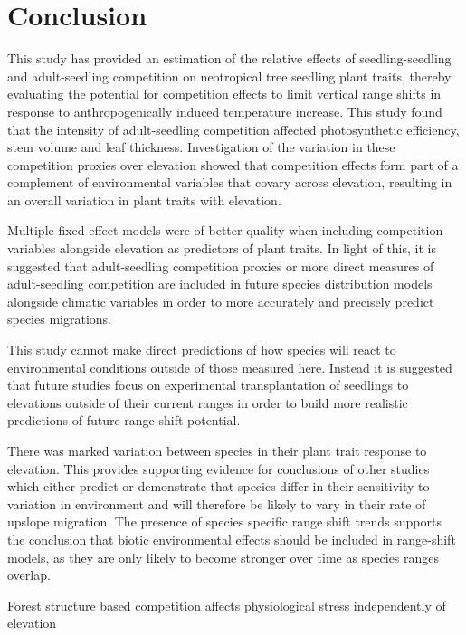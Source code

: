 \documentclass[a4paper,11pt]{article}
\begin{document}
\section*{Conclusion}

This study has provided an estimation of the relative effects of seedling-seedling and adult-seedling competition on neotropical tree seedling plant traits, thereby evaluating the potential for competition effects to limit vertical range shifts in response to anthropogenically induced temperature increase. This study found that the intensity of adult-seedling competition affected photosynthetic efficiency, stem volume and leaf thickness. Investigation of the variation in these competition proxies over elevation showed that competition effects form part of a complement of environmental variables that covary across elevation, resulting in an overall variation in plant traits with elevation.

Multiple fixed effect models were of better quality when including competition variables alongside elevation as predictors of plant traits. In light of this, it is suggested that adult-seedling competition proxies or more direct measures of adult-seedling competition are included in future species distribution models alongside climatic variables in order to more accurately and precisely predict species migrations.

This study cannot make direct predictions of how species will react to environmental conditions outside of those measured here. Instead it is suggested that future studies focus on experimental transplantation of seedlings to elevations outside of their current ranges in order to build more realistic predictions of future range shift potential. 

There was marked variation between species in their plant trait response to elevation. This provides supporting evidence for conclusions of other studies which either predict or demonstrate that species differ in their sensitivity to variation in environment and will therefore be likely to vary in their rate of upslope migration. The presence of species specific range shift trends supports the conclusion that biotic environmental effects should be included in range-shift models, as they are only likely to become stronger over time as species ranges overlap.


Forest structure based competition affects physiological stress independently of elevation



\end{document}
